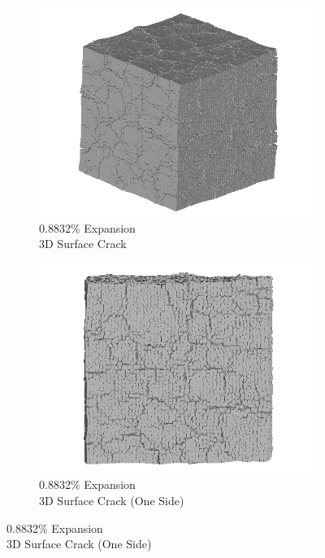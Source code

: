 \begin{figure}[ht!]
    \begin{subfigure}{.5\textwidth}
      \centering
      \includegraphics[width=0.5\linewidth]{Files/exp_3D/ASR/A30P75_4_3d.png}
      \caption{0.8832\% Expansion\\3D Surface Crack}
    \end{subfigure}%
    \begin{subfigure}{.5\textwidth}
      \centering
      \includegraphics[width=0.5\linewidth]{Files/exp_3D/ASR/A30P75_4_3ds.png}
      \caption{0.8832\% Expansion\\3D Surface Crack (One Side)}
    \end{subfigure}%


\end{figure}
